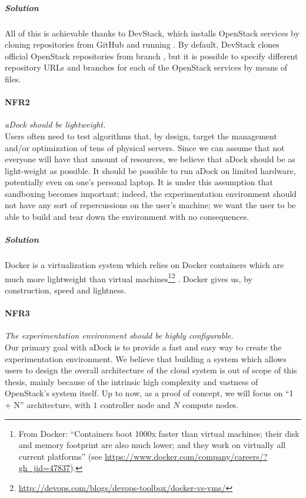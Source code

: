 \subparagraph{Solution} All of this is achievable thanks to DevStack, which installs OpenStack services by cloning repositories from GitHub and running . By default, DevStack clones official OpenStack repositories from branch , but it is possible to specify different repository URLs and branches for each of the OpenStack services by means of  files.

\paragraph{NFR2}\label{p:nfr2} \emph{aDock should be lightweight.} \hfill \\
Users often need to test algorithms that, by design, target the management and/or optimization of tens of physical servers. Since we can assume that not everyone will have that amount of resources, we believe that aDock should be as light-weight as possible. It should be possible to run aDock on limited hardware, potentially even on one's personal laptop. It is under this assumption that sandboxing becomes important; indeed, the experimentation environment should not have any sort of repercussions on the user's machine; we want the user to be able to build and tear down the environment with no consequences.

\subparagraph{Solution} Docker is a virtualization system which relies on Docker containers which are much more lightweight than virtual machines\footnote{From Docker: ``Containers boot 1000x faster than virtual machines; their disk and memory footprint are also much lower; and they work on virtually all current platforms'' (see \url{https://www.docker.com/company/careers/?gh_jid=47837}).}\footnote{\url{http://devops.com/blogs/devops-toolbox/docker-vs-vms/}} . Docker gives us, by construction, speed and lightness.

\paragraph{NFR3}\label{p:nfr3} \emph{The experimentation environment should be highly configurable.} \hfill \\
Our primary goal with aDock is to provide a fast and easy way to create the experimentation environment. We believe that building a system which allows users to design the overall architecture of the cloud system is out of scope of this thesis, mainly because of the intrinsic high complexity and vastness of OpenStack's system itself. Up to now, as a proof of concept, we will focus on ``1 + N'' architecture, with $1$ controller node and $N$ compute nodes.

